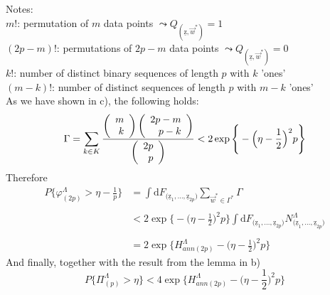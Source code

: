 Notes:\\
$m\mathrm{!}$: permutation of $m$ data points $\leadsto Q_{ ( \mathrm{\underline{z}}, \vec{w}^* )} = 1$\\
$(2p-m)\mathrm{!}$: permutations of $2p - m$ data points $\leadsto Q_{ ( \mathrm{\underline{z}}, \vec{w}^* )} = 0$\\
$k\mathrm{!}$: number of distinct binary sequences of length $p$ with $k$ 'ones'\\
$(m-k) \mathrm{!}$: number of distinct sequences of length $p$ with $m - k$ 'ones'\\
As we have shown in c), the following holds:
\begin{equation}
	\Gamma = \sum_{k \in K} \frac{ \left( \begin{array}{rrrrrrrrrrrrrrrrrrrrrrrrrr} m\\k\\ \end{array} \right) \left( \begin{array}{rrrrrrrrrrrrrrrrrrrrrrrrrr} 2p-m\\p-k\\ \end{array} \right) }{
			\left( \begin{array}{rrrrrrrrrrrrrrrrrrrrrrrrrr} 2p\\p\\ \end{array} \right)} < 2\exp\Bigg\{ -\Big( \eta -\frac{1}{2}
			\Big)^2 p\Bigg\}
\end{equation}
Therefore
\begin{equation}
	\begin{array}{ll}
	P\Big\{ \varphi_{ (2p) }^\Lambda > \eta - \frac{1}{p}\Big\}
	& = \int \mathrm{d} 
		F_{ \big( \mathrm{\underline{z}}_1, \ldots,
			\mathrm{\underline{z}}_{2p} \big) }
		\sum_{ \vec{w}^* \in \Gamma^* }
		\Gamma \\\\
	& < 2\exp\Bigg\{ -\Big( \eta -\frac{1}{2} \Big)^2 p\Bigg\}
		\int \mathrm{d} F_{ \big( \mathrm{\underline{z}}_1, \ldots,
			\mathrm{\underline{z}}_{2p} \big) }
		N_{ \big( \mathrm{\underline{z}}_1, \ldots,
			\mathrm{\underline{z}}_{2p} \big) }^\Lambda \\\\
	& = 2\exp\Bigg\{ H_{ ann (2p) }^\Lambda 
		- \Big( \eta -\frac{1}{2} \Big)^2 p\Bigg\}
	\end{array}
\end{equation}
And finally, together with the result from the lemma in b)
\begin{equation}
	P\Big\{ \Pi_{ (p) }^\Lambda > \eta \Big\}
	< 4\exp\Bigg\{ H_{ ann (2p) }^\Lambda 
		- \Big( \eta -\frac{1}{2} \Big)^2 p\Bigg\}
\end{equation}
